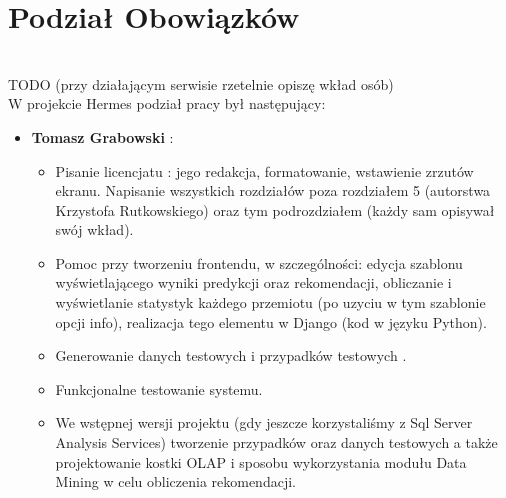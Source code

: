 \documentclass[licencjacka]{pracamgr}
\begin{document}
\section{Podział Obowiązków} ~\\

TODO (przy działającym serwisie rzetelnie opiszę wkład osób)
~\\ \indent W projekcie Hermes podział pracy był następujący:

\begin{itemize}
\item \textbf{Tomasz Grabowski} :
    \begin{itemize} 
    \item Pisanie licencjatu : jego redakcja, formatowanie, wstawienie zrzutów ekranu. Napisanie wszystkich rozdziałów poza rozdziałem 5 (autorstwa Krzystofa Rutkowskiego) oraz tym podrozdziałem (każdy sam opisywał swój wkład).
    \item Pomoc przy tworzeniu frontendu, w szczególności: edycja szablonu wyświetlającego wyniki predykcji oraz rekomendacji, obliczanie i wyświetlanie statystyk każdego przemiotu (po uzyciu w tym szablonie opcji info), realizacja tego elementu w Django (kod w języku Python). 
    \item Generowanie danych testowych i przypadków testowych .
    \item Funkcjonalne testowanie systemu. 
    \item We wstępnej wersji projektu (gdy jeszcze korzystaliśmy z Sql Server Analysis Services) tworzenie przypadków oraz danych testowych a także projektowanie kostki OLAP i sposobu wykorzystania modułu Data Mining w celu obliczenia rekomendacji.
    \end{itemize}


\end{itemize}
\end{document}
